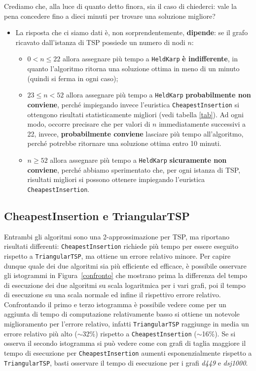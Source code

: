Crediamo che, alla luce di quanto detto finora, sia il caso di chiederci: vale la pena concedere fino a dieci minuti per trovare una soluzione migliore?
\begin{itemize}
	\item La risposta che ci siamo dati è, non sorprendentemente, \textbf{dipende}: se il grafo ricavato dall'istanza di TSP possiede un numero di nodi $n$:
	\begin{itemize}
		\item $0< n \leq 22 $ allora assegnare più tempo a \texttt{HeldKarp} \textbf{è indifferente}, in quanto l'algoritmo ritorna una soluzione ottima in meno di un minuto (quindi si ferma in ogni caso);
		\item $23 \leq n < 52$ allora assegnare più tempo a \texttt{HeldKarp}\textbf{ probabilmente non conviene}, perché impiegando invece l'euristica \texttt{CheapestInsertion} si ottengono risultati statisticamente migliori (vedi tabella \ref{tab}). Ad ogni modo, occorre precisare che per valori di $n$ immediatamente successivi a 22, invece, \textbf{probabilmente conviene} lasciare più tempo all'algoritmo, perché potrebbe ritornare una soluzione ottima entro 10 minuti.
		\item $ n\geq 52$ allora assegnare più tempo a \texttt{HeldKarp} \textbf{sicuramente non conviene}, perché abbiamo sperimentato che, per ogni istanza di TSP, risultati migliori si possono ottenere impiegando l'euristica \texttt{CheapestInsertion}.
	\end{itemize}
\end{itemize}

\subsection{CheapestInsertion e TriangularTSP}
Entrambi gli algoritmi sono una 2-approssimazione per TSP, ma riportano risultati differenti: \texttt{CheapestInsertion} richiede più tempo per essere eseguito rispetto a \texttt{TriangularTSP}, ma ottiene un errore relativo minore.\acapo 
Per capire dunque quale dei due algoritmi sia più efficiente ed efficace, è possibile osservare gli istogrammi in Figura~\ref{confronto} che mostrano prima la differenza del tempo di esecuzione dei due algoritmi su scala logaritmica per i vari grafi, poi il tempo di esecuzione su una scala normale ed infine il rispettivo errore relativo. Confrontando il primo e terzo istogramma è possibile vedere come per un aggiunta di tempo di computazione relativamente basso si ottiene un notevole miglioramento per l'errore relativo, infatti \texttt{TriangularTSP} raggiunge in media un errore relativo più alto ($\sim$32\%) rispetto a \texttt{CheapestInsertion} ($\sim$16\%). Se si osserva il secondo istogramma si può vedere come con grafi di taglia maggiore il tempo di esecuzione per \texttt{CheapestInsertion} aumenti esponenzialmente rispetto a \texttt{TriangularTSP}, basti osservare il tempo di esecuzione per i grafi \textit{d449} e \textit{dsj1000}. \acapo

